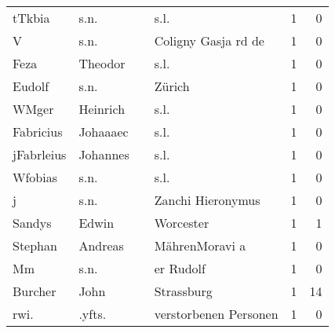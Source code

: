 \begin{center}
\begin{tiny}
\begin{longtabu}{llllrr}
                   tTkbia &                               s.n. &             &                                        s.l. &          1 &         0 \\
                        V &                               s.n. &             &                         Coligny Gasja rd de &          1 &         0 \\
                     Feza &                            Theodor &             &                                        s.l. &          1 &         0 \\
                   Eudolf &                               s.n. &             &                                      Zürich &          1 &         0 \\
                    WMger &                           Heinrich &             &                                        s.l. &          1 &         0 \\
                Fabricius &                           Johaaaec &             &                                        s.l. &          1 &         0 \\
               jFabrleius &                           Johannes &             &                                        s.l. &          1 &         0 \\
                  Wfobias &                               s.n. &             &                                        s.l. &          1 &         0 \\
                        j &                               s.n. &             &                           Zanchi Hieronymus &          1 &         0 \\
                   Sandys &                              Edwin &             &                                   Worcester &          1 &         1 \\
                  Stephan &                            Andreas &             &                              MährenMoravi a &          1 &         0 \\
                       Mm &                               s.n. &             &                                   er Rudolf &          1 &         0 \\
                  Burcher &                               John &             &                                  Strassburg &          1 &        14 \\
                     rwi. &                             .yfts. &             &                       verstorbenen Personen &          1 &         0 \\

\end{longtabu}
\end{tiny}
\end{center}
